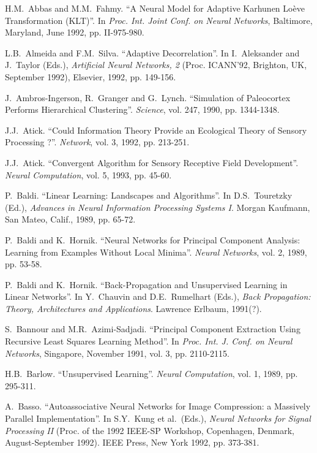 \begin{thebibliography}{999}
\baselineskip 3mm
\itemsep=-0.15cm
\leftmargin=0cm
\rightmargin=0cm

H.M.~Abbas and M.M.~Fahmy.
``A Neural Model for Adaptive Karhunen Lo\`{e}ve Transformation (KLT)''.
In {\em Proc. Int. Joint Conf. on Neural Networks}, Baltimore, Maryland,
June 1992, pp. II-975-980.

L.B.~Almeida and F.M.~Silva.
``Adaptive Decorrelation''.
In I.~Aleksander and J.~Taylor (Eds.), {\em Artificial Neural
Networks, 2} (Proc. ICANN'92, Brighton, UK, September 1992), Elsevier,
1992, pp. 149-156.

J.~Ambros-Ingerson, R.~Granger and G.~Lynch.
``Simulation of Paleocortex Performs Hierarchical Clustering''.
{\em Science}, vol. 247, 1990, pp. 1344-1348.   

J.J.~Atick.
``Could Information Theory Provide an Ecological Theory of Sensory
Processing ?''.
{\em Network}, vol. 3, 1992, pp. 213-251.

J.J.~Atick.
``Convergent Algorithm for Sensory Receptive Field Development''.
{\em Neural Computation}, vol. 5, 1993, pp. 45-60.

P.~Baldi.
``Linear Learning: Landscapes and Algorithms''.
In D.S.~Touretzky (Ed.), {\em Advances in Neural Information Processing
Systems I}. Morgan Kaufmann, San Mateo, Calif., 1989, pp. 65-72.

P.~Baldi and K.~Hornik.
``Neural Networks for Principal Component Analysis: Learning from
Examples Without Local Minima''.
{\em Neural Networks}, vol. 2, 1989, pp. 53-58.

P.~Baldi and K.~Hornik.
``Back-Propagation and Unsupervised Learning in Linear Networks''.
In Y.~Chauvin and D.E.~Rumelhart (Eds.), {\em Back Propagation:
Theory, Architectures and Applications}. Lawrence Erlbaum, 1991(?).

S.~Bannour and M.R.~Azimi-Sadjadi.
``Principal Component Extraction Using Recursive Least Squares Learning
Method''.
In {\em Proc. Int. J. Conf. on Neural Networks}, Singapore, November 1991,
vol. 3, pp. 2110-2115. 

H.B.~Barlow.
``Unsupervised Learning''.
{\em Neural Computation}, vol. 1, 1989, pp. 295-311.

A.~Basso.
``Autoassociative Neural Networks for Image Compression: a Massively
Parallel Implementation''.
In S.Y.~Kung et al.\ (Eds.), {\em Neural Networks for Signal
Processing II} (Proc. of the 1992 IEEE-SP Workshop, Copenhagen, Denmark,
August-September 1992). IEEE Press, New York 1992, pp. 373-381.


\end{thebibliography}
